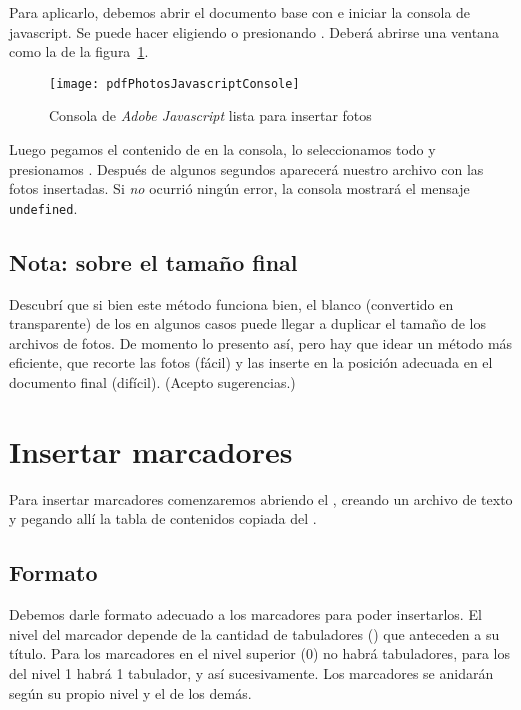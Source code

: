 \documentclass[%
	a5paper,
	10pt,
	twoside,
	openright,
	final,
]{memoir}
\begin{document}

	Para aplicarlo, debemos abrir el documento base  con \acrobat e iniciar la consola de javascript. Se puede hacer eligiendo  o presionando . Deberá abrirse una ventana como la de la figura~\ref{fig:pdfPhotosJavascriptConsole}.

	\begin{figure}
		\texttt{[image: pdfPhotosJavascriptConsole]}
		\caption{Consola de \emph{Adobe Javascript} lista para insertar fotos\label{fig:pdfPhotosJavascriptConsole}}
	\end{figure}

	Luego pegamos el contenido de  en la consola, lo seleccionamos todo y presionamos \keys{\ctrl + \return}. Después de algunos segundos aparecerá nuestro archivo  con las fotos insertadas. Si \emph{no} ocurrió ningún error, la consola mostrará el mensaje \texttt{undefined}.

	\subsection{Nota: sobre el tamaño final} Descubrí que si bien este método funciona bien, el blanco (convertido en transparente) de los \jpeg en algunos casos puede llegar a duplicar el tamaño de los archivos de fotos. De momento lo presento así, pero hay que idear un método más eficiente, que recorte las fotos (fácil) y las inserte en la posición adecuada en el documento final (difícil). (Acepto sugerencias.)

	\section{Insertar marcadores\label{sec:pdfBookmarks}} Para insertar marcadores comenzaremos abriendo el \notepad, creando un archivo de texto  y pegando allí la tabla de contenidos copiada del \pdf.

	\subsection{Formato} Debemos darle formato adecuado a los marcadores para poder insertarlos. El nivel del marcador depende de la cantidad de tabuladores (\keys{\tab}) que anteceden a su título. Para los marcadores en el nivel superior (0) no habrá tabuladores, para los del nivel 1 habrá 1 tabulador, y así sucesivamente. Los marcadores se anidarán según su propio nivel y el de los demás.
\end{document}
